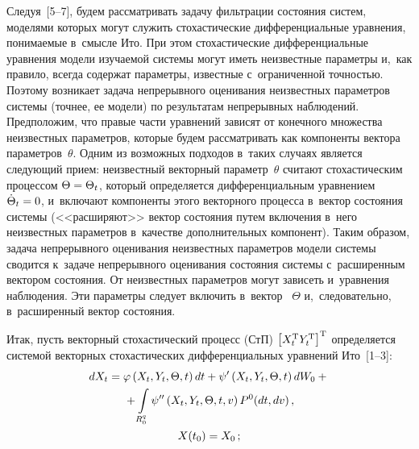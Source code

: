 \begin{multicols}{2}
Следуя~[5--7], будем рассматривать задачу фильт\-ра\-ции состояния систем, 
моделями которых могут служить
стохастические дифференциальные  уравнения, понимаемые в~смысле Ито. При 
этом стохастические дифференциальные урав\-не\-ния модели изучаемой системы могут
иметь неизвестные па\-ра\-мет\-ры и,~как правило, всегда содержат
параметры, известные с~ограниченной точ\-ностью. Поэтому возникает
задача непрерывного оценивания неизвестных па\-ра\-мет\-ров сис\-те\-мы
(точнее, ее модели) по результатам непрерывных наблюдений.
Предположим, что правые части урав\-не\-ний зависят от конечного множества 
неизвестных па\-ра\-мет\-ров, которые
будем рассматривать как компоненты вектора параметров~$\theta$.
Одним из возможных подходов в~таких случаях является следующий
прием: неизвестный векторный параметр~$\theta$ считают стохастическим
процессом  $\Theta \hm=\Theta_t$, который определяется
дифференциальным уравнением $\dot\Theta_t \hm=0$, и~включают
компоненты этого векторного процесса в~вектор со\-сто\-яния системы
(<<расширяют>> вектор состояния путем включения в~него неизвестных
параметров в~качестве дополнительных компонент).
Таким образом, задача непрерывного оценивания неизвестных
параметров модели системы сводится к~задаче непрерывного
оценивания состояния системы с~расширенным вектором состояния.
От неизвестных параметров могут зависеть и~уравнения наблюдения. 
Эти параметры следует включить в~вектор ~$\Theta$ и,~следовательно, 
в~расширенный вектор состояния.

Итак, пусть векторный стохастический процесс (СтП) 
$\left[ X_t^{\mathrm{T}} Y_t^{\mathrm{T}} \right]^{\mathrm{T}}$
определяется системой векторных стохастических дифференциальных
уравнений Ито~[1--3]:
    \begin{multline}
    dX_t =\varphi \left(X_t,Y_t,\Theta, t\right) dt + 
    \psi' \left(X_t,Y_t,\Theta, t\right) dW_0 +{}\\
{}+\int\limits_{R_0^q} \psi''
    \left(X_t,Y_t,\Theta, t,v\right) P^0 (dt, dv)\,,\\
     X(t_0) = X_0\,;
    \label{e2.1-s}
    \end{multline}
    
    \vspace*{-12pt}
    

\end{multicols}
